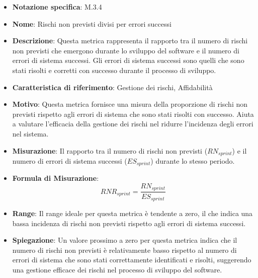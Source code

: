 \begin{itemize}
    \item \textbf{Notazione specifica}: M.3.4
    \item \textbf{Nome}: Rischi non previsti divisi per errori successi
    \item \textbf{Descrizione}: Questa metrica rappresenta il rapporto tra il numero di rischi non previsti che emergono durante lo sviluppo del software e il numero di errori di sistema successi. Gli errori di sistema successi sono quelli che sono stati risolti e corretti con successo durante il processo di sviluppo.
    \item \textbf{Caratteristica di riferimento}: Gestione dei rischi, Affidabilità
    \item \textbf{Motivo}: Questa metrica fornisce una misura della proporzione di rischi non previsti rispetto agli errori di sistema che sono stati risolti con successo. Aiuta a valutare l'efficacia della gestione dei rischi nel ridurre l'incidenza degli errori nel sistema.
    \item \textbf{Misurazione}: Il rapporto tra il numero di rischi non previsti (\( RN_{sprint} \)) e il numero di errori di sistema successi (\( ES_{sprint} \)) durante lo stesso periodo.
    \item \textbf{Formula di Misurazione}:
    \[
    RNR_{sprint} = \frac{RN_{sprint}}{ES_{sprint}}
    \]
    \item \textbf{Range}: Il range ideale per questa metrica è tendente a zero, il che indica una bassa incidenza di rischi non previsti rispetto agli errori di sistema successi.
    \item \textbf{Spiegazione}: Un valore prossimo a zero per questa metrica indica che il numero di rischi non previsti è relativamente basso rispetto al numero di errori di sistema che sono stati correttamente identificati e risolti, suggerendo una gestione efficace dei rischi nel processo di sviluppo del software.
\end{itemize}
